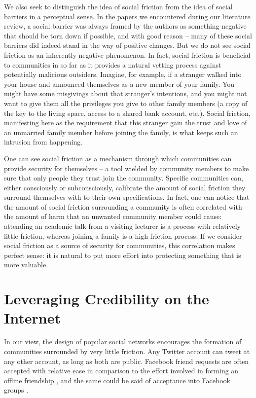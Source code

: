 \documentclass[sigconf,authordraft]{acmart}
\begin{document}
We also seek to distinguish the idea of social friction from the idea of social barriers in a perceptual sense. In the papers we encountered during our literature review, a social barrier was always framed by the authors as something negative that should be torn down if possible, and with good reason -- many of these social barriers did indeed stand in the way of positive changes. But we do not see social friction as an inherently negative phenomenon. In fact, social friction is beneficial to communities in so far as it provides a natural vetting process against potentially malicious outsiders. Imagine, for example, if a stranger walked into your house and announced themselves as a new member of your family. You might have some misgivings about that stranger's intentions, and you might not want to give them all the privileges you give to other family members (a copy of the key to the living space, access to a shared bank account, etc.). Social friction, manifesting here as the requirement that this stranger gain the trust and love of an unmarried family member before joining the family, is what keeps such an intrusion from happening. 


One can see social friction as a mechanism through which communities can provide security for themselves -- a tool wielded by community members to make sure that only people they trust join the community. Specific communities can, either consciously or subconsciously, calibrate the amount of social friction they surround themselves with to their own specifications. In fact, one can notice that the amount of social friction surrounding a community is often correlated with the amount of harm that an unwanted community member could cause: attending an academic talk from a visiting lecturer is a process with relatively little friction, whereas joining a family is a high-friction process. If we consider social friction as a source of security for communities, this correlation makes perfect sense: it is natural to put more effort into protecting something that is more valuable.

\section{Leveraging Credibility on the Internet}
\label{sec:friction}

In our view, the design of popular social networks encourages the formation of communities surrounded by very little friction. Any Twitter account can tweet at any other account, as long as both are public. Facebook friend requests are often accepted with relative ease in comparison to the effort involved in forming an offline friendship \cite{rashtian2014befriend}, and the same could be said of acceptance into Facebook groups \cite{park2009being}. 
\end{document}
